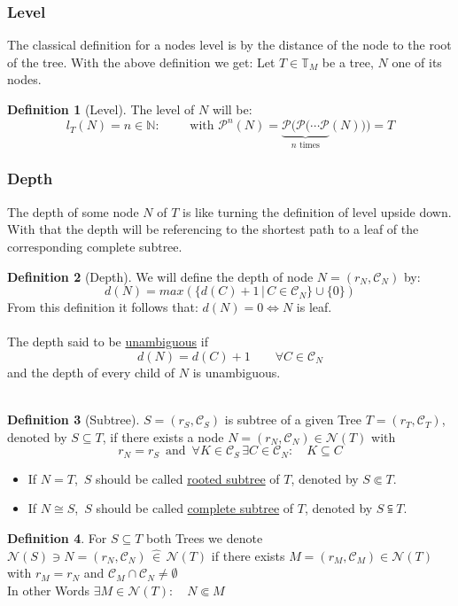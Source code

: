 \documentclass[a4paper,12pt]{article}
\theoremstyle{definition}
\newtheorem{definition}{Definition}[section]
\begin{document}
		\subsubsection{Level}
		The classical definition for  a nodes level is by the distance of the node to the root of the tree.
		With the above definition we get:
		Let $T\in\mathds{T}_M$ be a tree, $N$ one of its nodes.  
		\begin{definition}[Level]
			 The level of $N$ will be: \[l_T(N)=n\in \mathds{N}:\qquad\text{ with } \mathcal{P}^{n}(N)=\underbrace{\mathcal{P}(\mathcal{P}(\cdots \mathcal{P}}_{n\text{ times}}(N)))=T \]
		\end{definition}
		\subsubsection{Depth}
		The depth of some node $N$ of $T$ is like turning the definition of level upside down. With that the depth will be referencing to the shortest path to a leaf of the corresponding complete subtree.\\
	\begin{definition}[Depth]
			We will define the depth of node $N=(r_N,\mathcal{C}_N)$ by:
		\[d(N)= max\left(\{d(C)+1\,\vert\, C\in\mathcal{C}_N\} \cup \{0\}\right)\]
		From this definition it follows that: $d(N)=0 \Leftrightarrow N$ is leaf.\\\\
		The depth said to be \underline{unambiguous} if \[d(N)=d(C) + 1\qquad \forall C\in\mathcal{C}_N\] 
		and the depth of every child of $N$ is unambiguous.\\\\
	\end{definition}
		

			\begin{definition}[Subtree]
				$S=(r_S,\mathcal{C}_S)$ is subtree of a given Tree $T=(r_T,\mathcal{C}_T)$, denoted by $S\subseteq T$, if there exists a node $N=(r_N,\mathcal{C}_N)\in \mathcal{N}(T)$ with \[r_N=r_S\,\text{ and }\, \forall K\in \mathcal{C}_S\,\exists C\in  \mathcal{C}_N:\quad   K\subseteq C\]
				\begin{itemize}
					\item	If $N = T$, $\,S$ should be called \underline{rooted subtree} of $T$, denoted by $S\Subset T$.
					\item 	If $N \cong S$, $\,S$ should be called \underline{complete subtree}  of $T$, denoted by $S\subseteqq T$.\\
				\end{itemize}
			\end{definition}
			\begin{definition}
				For $S\subseteq T$ both Trees we denote $\mathcal{N}(S)\ni N=(r_N, \mathcal{C}_N) \,\hat{\in}\, \mathcal{N}(T) $ if there exists $M=(r_M, \mathcal{C}_M)\in \mathcal{N}(T)$ with $r_M=r_N$ and $\mathcal{C}_M \cap \mathcal{C}_N \not = \emptyset$\\
				In other Words $\exists M\in \mathcal{N}(T): \quad N\Subset M$
			\end{definition}
			
\end{document}
